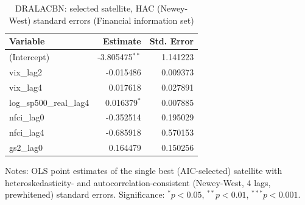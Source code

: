 \begin{table}[!htbp]
\centering
\caption{DRALACBN: selected satellite, HAC (Newey-West) standard errors (Financial information set)}
\label{tab:dralacbn_financial_satellite_hac}
\begin{tabular}{lrr}
\toprule
Variable & Estimate & Std. Error \\
\midrule
(Intercept) & -3.805475$^{**}$ & 1.141223 \\
vix_lag2 & -0.015486 & 0.009373 \\
vix_lag4 & 0.017618 & 0.027891 \\
log_sp500_real_lag4 & 0.016379$^{*}$ & 0.007885 \\
nfci_lag0 & -0.352514 & 0.195029 \\
nfci_lag4 & -0.685918 & 0.570153 \\
gs2_lag0 & 0.164479 & 0.150256 \\
\bottomrule
\end{tabular}
\begin{tablenotes}
\small
\item Notes: OLS point estimates of the single best (AIC-selected) satellite with heteroskedasticity- and autocorrelation-consistent (Newey-West, 4 lags, prewhitened) standard errors. Significance: $^{*}p<0.05$, $^{**}p<0.01$, $^{***}p<0.001$.
\end{tablenotes}
\end{table}
